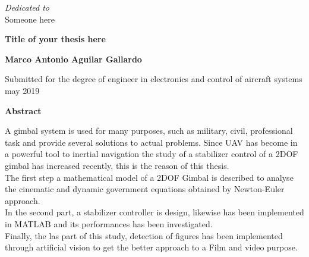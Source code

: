 \newpage
\thispagestyle{empty}
\begin{center}
 \vspace*{2cm}
  \textit{\LARGE {Dedicated to}}\\ 
 Someone here
\end{center}


\newpage
\thispagestyle{empty}
\begin{center}
  \textbf{\Large Title of your thesis here}

  \vspace*{1cm}
  \textbf{\large Marco Antonio Aguilar Gallardo}

  \vspace*{0.5cm}
  {\large Submitted for the degree of engineer in electronics and control of aircraft systems\\ may 2019}

  \vspace*{1cm}
  \textbf{\large Abstract}
\end{center}
A gimbal system is used for many purposes, such as military, civil, professional task and provide several solutions to actual problems. Since UAV has become in a powerful tool to inertial navigation the study of a stabilizer control of a 2DOF gimbal has increased recently, this is the reason of this thesis.\\
The first step a mathematical model of a 2DOF Gimbal is described to analyse the cinematic and dynamic government equations obtained by Newton-Euler approach. \\
In the second part, a stabilizer controller is design, likewise has been implemented in MATLAB and its performances has been investigated.\\
Finally, the las part of this study, detection of figures has been implemented through artificial vision to get the better approach to a 	Film and video purpose. 


